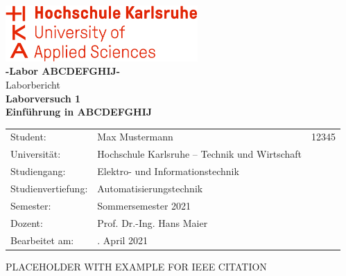 \documentclass[11pt]{article}
\begin{document}
\begin{titlepage}
    \begin{center}
        \includegraphics[width=0.55\textwidth]{Images/Template/HsKa_new.png}\\[16ex]
        \huge{\textbf{-Labor ABCDEFGHIJ-}\\Laborbericht}\\[8ex]
        \large{\textbf{Laborversuch 1}}\\[1ex]
        \LARGE{\textbf{Einführung in ABCDEFGHIJ}}\\[14ex]
        \normalsize{}
        \begin{tabular}{lll}
            Student:            & \quad Max Mustermann                                  & 12345 \\[2ex]     %
            Universität:        & \quad Hochschule Karlsruhe – Technik und Wirtschaft   &       \\[2ex]
            Studiengang:        & \quad Elektro- und Informationstechnik                &       \\[2ex]
            Studienvertiefung:  & \quad Automatisierungstechnik                         &       \\[2ex]
            Semester:           & \quad Sommersemester 2021                             &       \\[2ex]
            Dozent:             & \quad Prof. Dr.-Ing. Hans Maier                       &       \\[2ex]
            Bearbeitet am:      & \quad 16. April 2021                                  &       \\[2ex]
        \end{tabular}
    \end{center}
\end{titlepage}
\newpage
\tableofcontents
\newpage
{}
PLACEHOLDER WITH EXAMPLE FOR IEEE CITATION \cite{einstein}

\newpage                                          
\printbibliography[heading= bibintoc, title={Literaturverzeichnis}]
\newpage
\listoffigures
{}
\newpage
\listoftables
{}
\end{document}
